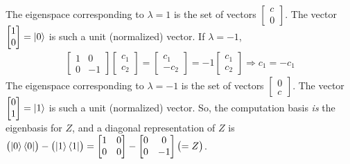 The eigenspace corresponding to $\lambda = 1$ is the set of vectors $\begin{bmatrix}c \\ 0\end{bmatrix}$.  The vector $\begin{bmatrix} 1 \\ 0\end{bmatrix}=\ket{0}$ is such a unit (normalized) vector. 
If $\lambda = -1$,
\begin{align*}
	\begin{bmatrix}
		1 & 0 \\
		0 & -1
	\end{bmatrix}
	\begin{bmatrix}
		c_1 \\
		c_2
	\end{bmatrix} =
	\begin{bmatrix}
	      c_1 \\
	      -c_2
	\end{bmatrix} =
	 -1
	\begin{bmatrix}
		c_1 \\
		c_2
	\end{bmatrix}
	\Rightarrow c_1 = -c_1
\end{align*}
The eigenspace corresponding to $\lambda = -1$ is the set of vectors $\begin{bmatrix}0 \\ c\end{bmatrix}$.  The vector $\begin{bmatrix} 0 \\ 1\end{bmatrix}=\ket{1}$ is such a unit (normalized) vector.  So, the computation basis \textit{is} the eigenbasis for $Z$, and a diagonal representation of $Z$ is $\bigl(\ket{0}\bra{0}\bigr) - \bigl(\ket{1}\bra{1}\bigr) = \begin{bmatrix}1 & 0 \\ 0 & 0\end{bmatrix} - \begin{bmatrix}0 & 0 \\ 0 & -1\end{bmatrix} \bigl( = Z\bigr)$.



